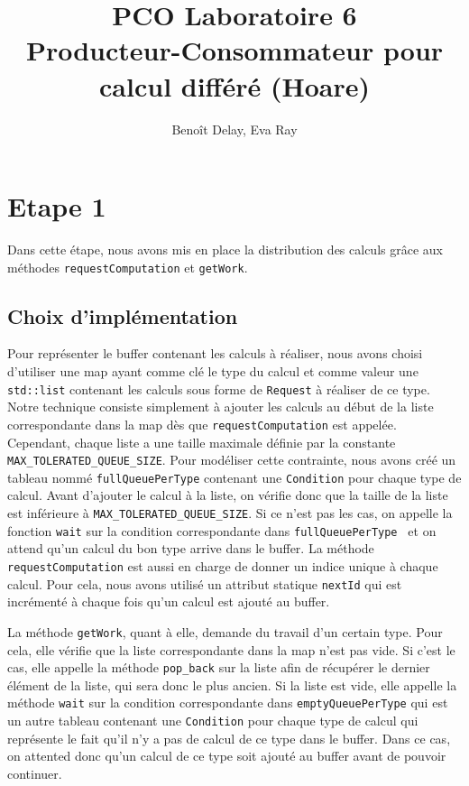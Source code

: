 \documentclass{article}
\title{PCO Laboratoire 6 \\
\large Producteur-Consommateur pour calcul différé (Hoare)}
\author{Benoît Delay, Eva Ray}
\begin{document}
\maketitle

\section{Etape 1}
Dans cette étape, nous avons mis en place la distribution des calculs grâce aux méthodes \texttt{requestComputation} et
\texttt{getWork}.

\subsection{Choix d'implémentation}
Pour représenter le buffer contenant les calculs à réaliser, nous avons choisi d'utiliser une map ayant comme clé le
type du calcul et comme valeur une \texttt{std::list} contenant les calculs sous forme de \texttt{Request} à réaliser de
ce type.
Notre
technique consiste simplement à ajouter les calculs au début de la liste correspondante dans la map dès que
\texttt{requestComputation} est appelée.
Cependant, chaque liste a une taille maximale définie par la constante \texttt{MAX\_TOLERATED\_QUEUE\_SIZE}. Pour
modéliser cette contrainte, nous avons créé un tableau nommé \texttt{fullQueuePerType} contenant une \texttt{Condition}
pour chaque type de calcul.
Avant d'ajouter le calcul à la liste, on vérifie donc que la taille de la liste est inférieure à \texttt{MAX\_TOLERATED\_QUEUE\_SIZE}.
Si ce n'est pas les cas, on appelle la fonction \texttt{wait} sur la condition correspondante dans \texttt{fullQueuePerType
} et on attend qu'un calcul du bon type arrive dans le buffer.
La méthode \texttt{requestComputation} est aussi en charge de donner un indice unique à chaque calcul. Pour cela,
nous avons utilisé un attribut statique \texttt{nextId} qui est incrémenté à chaque fois qu'un calcul est ajouté au
buffer.

La méthode \texttt{getWork}, quant à elle, demande du travail d'un certain type. Pour cela, elle vérifie que la liste
correspondante dans la map n'est pas vide. Si c'est le cas, elle appelle la méthode \texttt{pop\_back} sur la liste
afin de récupérer le dernier élément de la liste, qui sera donc le plus ancien. Si la liste est vide, elle appelle la
méthode \texttt{wait} sur la condition correspondante dans \texttt{emptyQueuePerType} qui est un autre tableau
contenant une \texttt{Condition} pour chaque type de calcul qui représente le fait qu'il n'y a pas de calcul de ce
type dans le buffer. Dans ce cas, on attented donc qu'un calcul de ce type soit ajouté au buffer avant de pouvoir
continuer.
\end{document}
